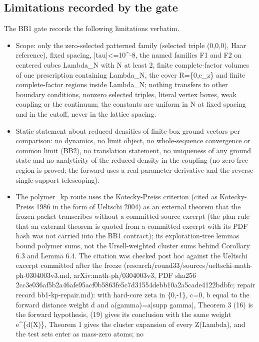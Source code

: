 \subsection{Limitations recorded by the gate}
\label{sec:bb1-limits}
The BB1 gate records the following limitations verbatim.
\begin{gatequote}
\begin{itemize}
\item Scope: only the zero-selected patterned family (selected triple (0,0,0),
Haar reference), fixed spacing, |tau|<=10\textasciicircum{}-8, the named
families F1 and F2 on centered cubes Lambda\_N with N at least 2, finite
complete-factor volumes of one prescription containing Lambda\_N, the cover
R=\{0,e\_z\} and finite complete-factor regions inside Lambda\_N; nothing
transfers to other boundary conditions, nonzero selected triples, literal
vertex boxes, weak coupling or the continuum; the constants are uniform in N
at fixed spacing and in the cutoff, never in the lattice spacing.
\item Static statement about reduced densities of finite-box ground vectors
per comparison: no dynamics, no limit object, no whole-sequence convergence or
common limit (BB2), no translation statement, no uniqueness of any ground
state and no analyticity of the reduced density in the coupling (no zero-free
region is proved; the forward uses a real-parameter derivative and the reverse
single-support telescoping).
\item The polymer\_kp route uses the Kotecky-Preiss criterion (cited as
Kotecky-Preiss 1986 in the form of Ueltschi 2004) as an external theorem that
the frozen packet transcribes without a committed source excerpt (the plan
rule that an external theorem is quoted from a committed excerpt with its PDF
hash was not carried into the BB1 contract); its exploration-tree lemmas bound
polymer sums, not the Ursell-weighted cluster sums behind Corollary 6.3 and
Lemma 6.4. The citation was checked post hoc against the Ueltschi excerpt
committed after the freeze
(research/round33/sources/ueltschi-math-ph-0304003v3.md,
arXiv:math-ph/0304003v3, PDF sha256
2cc3e036af5b2a46afe95acf0b5863fe5c7d31554debb10a2a5cade4122bdbfc; repair
record bb1-kp-repair.md): with hard-core zeta in \{0,-1\}, c=0, b equal to the
forward distance weight d and a(gamma)=a|supp gamma|, Theorem 3 (16) is the
forward hypothesis, (19) gives its conclusion with the same weight
e\textasciicircum{}\{d(X)\}, Theorem 1 gives the cluster expansion of every
Z(Lambda\textquotesingle{}), and the test sets enter as mass-zero atoms; no

\end{itemize}
\end{gatequote}
